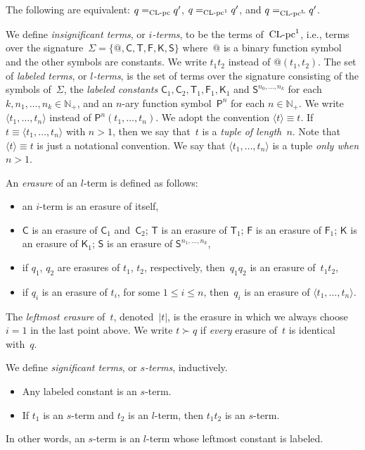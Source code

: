 \documentclass[a4paper,UKenglish]{lipics-v2016}
\newcommand{\Ps}{\mathsf{P}}
\newcommand{\Cs}{\mathsf{C}}
\newcommand{\Fs}{\mathsf{F}}
\newcommand{\Ts}{\mathsf{T}}
\newcommand{\Ss}{\mathsf{S}}
\newcommand{\Ks}{\mathsf{K}}
\newcommand{\erase}[1]{\ensuremath{|#1|}}
\newcommand{\Nbb}{\ensuremath{\mathbb{N}}}
\newcommand{\la}{\ensuremath{\langle}}
\newcommand{\ra}{\ensuremath{\rangle}}
\newcommand{\CLC}{{\mbox{${\text{\rm CL-pc}^1}$}}}
\newcommand{\sCLC}{{\ensuremath{\text{\rm CL-pc}^1}}}
\newcommand{\sCLCz}{\ensuremath{\text{\rm CL-pc}}}
\newcommand{\sCLCp}{\ensuremath{\text{\rm CL-pc}^{\mathrm{L}}}}
\newcommand{\equiverased}{\succ}
\begin{document}
\begin{lemma}\label{lem_clc_equivalent}
  The following are equivalent: $q =_{\sCLCz} q'$, $q =_{\sCLC} q'$,
  and $q =_{\sCLCp} q'$.
\end{lemma}

\begin{definition}\label{def_terms}
  We define \emph{insignificant terms}, or \emph{$i$-terms}, to be the
  terms of~$\CLC$, i.e., terms over the
  signature~$\Sigma = \{@, \Cs, \Ts, \Fs, \Ks, \Ss \}$ where~$@$ is a
  binary function symbol and the other symbols are constants. We write
  $t_1 t_2$ instead of $@(t_1,t_2)$.  The set of \emph{labeled terms},
  or \emph{$l$-terms}, is the set of terms over the signature
  consisting of the symbols of~$\Sigma$, the \emph{labeled constants}
  $\Cs_1, \Cs_2, \Ts_1, \Fs_1, \Ks_1$ and $\Ss^{n_0,\ldots,n_k}$ for
  each $k,n_1,\ldots,n_k \in \Nbb_+$, and an $n$-ary function
  symbol~$\Ps^n$ for each $n \in \Nbb_+$. We write
  $\la t_1,\ldots,t_n \ra$ instead of $\Ps^n(t_1,\ldots,t_n)$. We
  adopt the convention $\la t \ra \equiv t$. If
  $t \equiv \la t_1, \ldots, t_n \ra$ with $n > 1$, then we say
  that~$t$ is a \emph{tuple of length~$n$}. Note that
  $\la t \ra \equiv t$ is just a notational convention. We say that
  $\la t_1, \ldots, t_n \ra$ is a tuple \emph{only when $n > 1$}.

  An \emph{erasure} of an $l$-term is defined as follows:
  \begin{itemize}
  \item an $i$-term is an erasure of itself,
  \item $\Cs$ is an erasure of $\Cs_1$ and~$\Cs_2$; $\Ts$ is an erasure of
    $\Ts_1$; $\Fs$ is an erasure of $\Fs_1$; $\Ks$ is an erasure of $\Ks_1$; $\Ss$
    is an erasure of $\Ss^{n_1,\ldots,n_k}$,
  \item if $q_1$, $q_2$ are erasures of $t_1$, $t_2$, respectively,
    then~$q_1 q_2$ is an erasure of~$t_1 t_2$,
  \item if $q_i$ is an erasure of $t_i$, for some $1 \le i \le n$,
    then~$q_i$ is an erasure of $\la t_1,\ldots,t_n \ra$.
  \end{itemize}
  The \emph{leftmost erasure} of~$t$, denoted~$\erase{t}$, is the
  erasure in which we always choose~$i=1$ in the last point above. We
  write $t \equiverased q$ if \emph{every} erasure of~$t$ is identical
  with~$q$.

  We define \emph{significant terms}, or \emph{$s$-terms},
  inductively.
  \begin{itemize}
  \item Any labeled constant is an $s$-term.
  \item If $t_1$ is an $s$-term and $t_2$ is an $l$-term, then $t_1
    t_2$ is an $s$-term.
  \end{itemize}
  In other words, an $s$-term is an $l$-term whose leftmost constant
  is labeled.
\end{definition}
\end{document}
